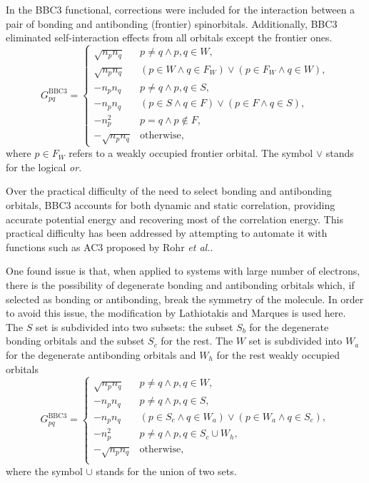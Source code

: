 In the BBC3 functional, corrections were included for the interaction between a pair 
of bonding and antibonding (frontier) spinorbitals.
Additionally, BBC3 eliminated self-interaction effects from all orbitals except
the frontier ones.
\begin{equation} \label{eq:GBBC3}
    G_{pq}^{\text{BBC3}} =
    \begin{cases}
        \sqrt{n_p n_q} &
        p\not=q \wedge p,q \in W,
        \\
        \sqrt{n_p n_q} &
        \left( p \in W \wedge q \in F_W \right) \vee
        \left( p \in F_W \wedge q \in W \right),
        \\
        -n_p n_q &
        p\not=q \wedge p,q \in S,
        \\
        -n_p n_q &
        \left( p \in S \wedge q \in F \right) \vee
        \left( p \in F \wedge q \in S \right),
        \\
        -n_p^{2} & p=q \wedge p\not\in F, \\
        - \sqrt{n_p n_q} & \text{otherwise},
    \end{cases}
\end{equation}
where $p \in F_W$ refers to a weakly occupied frontier orbital.
The symbol $\vee$ stands for the logical \textit{or}.

Over the practical difficulty of the need to select bonding and antibonding
orbitals, BBC3 accounts for both dynamic and static correlation, providing 
accurate potential energy and recovering most of the correlation energy. 
This practical difficulty has been addressed by attempting to automate it with
functions such as AC3 proposed by Rohr \textit{et al.}.

One found issue is that, when applied to systems with large number of
electrons, there is the possibility of degenerate bonding and antibonding
orbitals which, if selected as bonding or antibonding, break the symmetry
of the molecule.
In order to avoid this issue, the modification by Lathiotakis and 
Marques is used here.
The $S$ set is subdivided into
two subsets: the subset $S_b$ for the degenerate bonding orbitals and the subset
$S_c$ for the rest. The $W$ set is subdivided into $W_a$ for the degenerate
antibonding orbitals and $W_h$ for the rest weakly occupied orbitals
\begin{equation} \label{eq:GBBC3M}
    G_{pq}^{\text{BBC3}} = 
    \begin{cases}
        \sqrt{n_p n_q} & p \not= q \wedge p,q \in W, \\
        -n_p n_q & p \not= q \wedge p,q \in S, \\
        -n_p n_q & \left( p \in S_c \wedge q \in W_a \right) \vee \left( p \in W_a \wedge q \in S_c \right), \\
        -n_p^{2} & p \not= q \wedge p,q \in S_c \cup W_h, \\
        -\sqrt{n_p n_q} & \text{otherwise}, \\
    \end{cases}
\end{equation}
where the symbol $\cup$ stands for the union of two sets.


